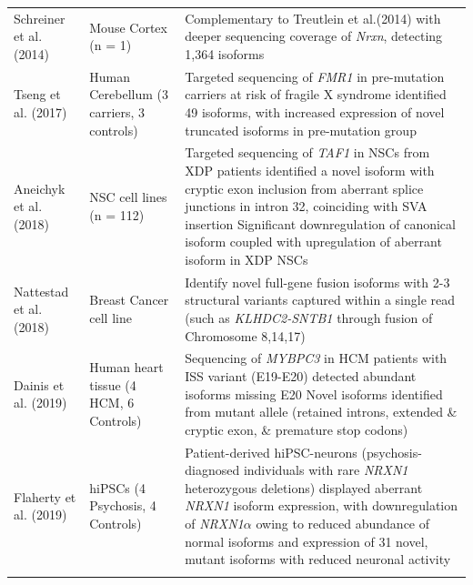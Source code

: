 \begin{changemargin}{1.5cm}
\begin{landscape}
\begin{longtable}[c]{p{4cm}p{4cm}p{18cm}}
			\centering Schreiner et al. (2014)\cite{Schreiner2014} &
			\centering Mouse Cortex (n = 1) &
			\tabitem Complementary to Treutlein et al.(2014) with deeper sequencing coverage of \textit{Nrxn}, detecting 1,364 isoforms\\
			\hdashline[0.5pt/5pt]
			
			\centering Tseng et al. (2017) \cite{Tseng2017} &
			\centering Human Cerebellum \newline (3 carriers, 3 controls)  &
			\tabitem Targeted sequencing of \textit{FMR1} in pre-mutation carriers at risk of fragile X syndrome identified 49 isoforms, with increased expression of novel truncated isoforms in pre-mutation group \\
			\hdashline[0.5pt/5pt]	
			
			\centering Aneichyk et al.(2018) \cite{Aneichyk2018} &
			\centering NSC cell lines (n = 112)  &
			\tabitem Targeted sequencing of \textit{TAF1} in NSCs from XDP patients identified a novel isoform with cryptic exon inclusion from aberrant splice junctions in intron 32, coinciding with SVA insertion \newline
			\tabitem Significant downregulation of canonical isoform coupled with upregulation of aberrant isoform in XDP NSCs\\
			\hdashline[0.5pt/5pt]	
			
			\centering Nattestad et al. (2018) \cite{Nattestad2018} &
			\centering Breast Cancer cell line  &
			\tabitem Identify novel full-gene fusion isoforms with 2-3 structural variants captured within a single read (such as \textit{KLHDC2-SNTB1} through fusion of Chromosome 8,14,17) \\			
			
			\centering Dainis et al. (2019) \cite{Dainis2019} &
			\centering Human heart tissue (4 HCM, 6 Controls) &
			\tabitem Sequencing of \textit{MYBPC3} in HCM patients with ISS variant (E19-E20) detected abundant isoforms missing E20 \newline
			\tabitem Novel isoforms identified from mutant allele (retained introns, extended \& cryptic exon, \& premature stop codons)  \\
			\hdashline[0.5pt/5pt]	
			
			\centering Flaherty et al. (2019) \cite{Flaherty2019} &
			\centering hiPSCs \newline (4 Psychosis, 4 Controls)  &
			\tabitem Patient-derived hiPSC-neurons (psychosis-diagnosed individuals with rare \textit{NRXN1} heterozygous deletions) displayed aberrant \textit{NRXN1} isoform expression, with downregulation of \textit{NRXN1$\alpha$} owing to reduced abundance of normal isoforms and expression of 31 novel, mutant isoforms with reduced neuronal activity  \\
			\hdashline[0.5pt/5pt]
			

\end{longtable}
\end{landscape}
\end{changemargin}
